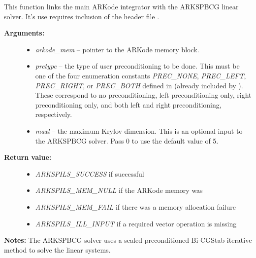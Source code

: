\documentclass[letterpaper,10pt,english]{sphinxmanual}
\begin{document}

\begin{fulllineitems}
\label{c_interface/User_callable:c.ARKSpbcg}
This function links the main ARKode integrator with the ARKSPBCG
linear solver.  It's use requires inclusion of the header file
.
\begin{description}
\item[{\textbf{Arguments:}}] \leavevmode\begin{itemize}
\item {} 
\emph{arkode\_mem} -- pointer to the ARKode memory block.

\item {} 
\emph{pretype} -- the type of user preconditioning to be done.  This
must be one of the four enumeration constants \emph{PREC\_NONE},
\emph{PREC\_LEFT}, \emph{PREC\_RIGHT}, or \emph{PREC\_BOTH} defined in
  (already included by
). These correspond to no preconditioning,
left preconditioning only, right preconditioning only, and
both left and right preconditioning, respectively.

\item {} 
\emph{maxl} -- the maximum Krylov dimension. This is an optional input
to the ARKSPBCG solver. Pass 0 to use the default value of 5.

\end{itemize}

\item[{\textbf{Return value:}}] \leavevmode\begin{itemize}
\item {} 
\emph{ARKSPILS\_SUCCESS} if successful

\item {} 
\emph{ARKSPILS\_MEM\_NULL}  if the ARKode memory was 

\item {} 
\emph{ARKSPILS\_MEM\_FAIL}  if there was a memory allocation failure

\item {} 
\emph{ARKSPILS\_ILL\_INPUT} if a required vector operation is missing

\end{itemize}

\end{description}

\textbf{Notes:} The ARKSPBCG solver uses a scaled preconditioned Bi-CGStab
iterative method to solve the linear systems.

\end{fulllineitems}
\end{document}

